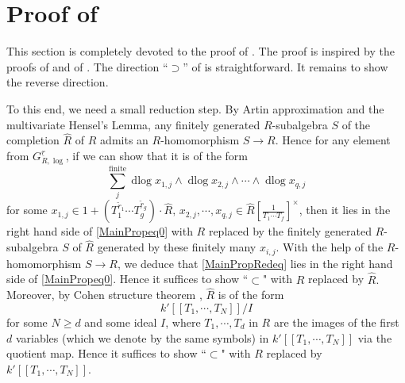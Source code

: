 \documentclass[11pt]{amsart}
\newcommand{\eq}[2]{\begin{equation}\label{#1}#2 \end{equation}}
\newcommand{\ra}{\rightarrow}
\newcommand{\dlog}{\operatorname{dlog}}
\renewcommand{\hat}{\widehat}
\newcommand{\ul}{\underline}
\renewcommand{\tilde}{\widetilde}
\theoremstyle{plain}
\theoremstyle{definition}
\numberwithin{equation}{prop}
\begin{document}
\section{{Proof of }}
This section is completely devoted to the proof of .
The proof is inspired by the proofs of \cite[Proposition 1.2.3]{JSZ} and of \cite[Proposition 1]{Kato82}.
The direction ``$\supset$'' of  is straightforward.
It remains to show the reverse direction.

To this end, we need a small reduction step.
By Artin approximation \cite[Theorem 1.10]{Artin} and the multivariate Hensel's Lemma, any finitely generated $R$-subalgebra $S$ of the completion $\hat R$ of $R$  admits an $R$-homomorphism $S\ra R$. 
Hence for any element from $G^{\ul r}_{R, \log}$, if we can show that it is of the form
\eq{MainPropRedeq}{\sum_j^{\text{finite}}\dlog x_{1,j}\wedge \dlog x_{2,j}\wedge\cdots \wedge\dlog x_{q,j}}
for some
$x_{1,j}\in 
1+(T_1^{\tilde r_1}\cdots  T_g^{\tilde r_g})\cdot \hat R,\,
x_{2,j},\cdots,x_{q,j} \in \hat R[\frac{1}{T_1\cdots T_f}]^\times$,
then it lies in the right hand side of \eqref{MainPropeq0} with $R$ replaced by the finitely generated $R$-subalgebra $S$ of $\hat R$ generated by these finitely many $x_{i,j}$.
With the help of the $R$-homomorphism $S\ra R$, 
we deduce that \eqref{MainPropRedeq} lies in the right hand side of \eqref{MainPropeq0}.
Hence it suffices to show ``$\subset$" with $R$ replaced by $\hat R.$
Moreover, by Cohen structure theorem \cite[\href{https://stacks.math.columbia.edu/tag/032A}{Tag 032A}]{stacks-project}, $\hat R$ is of the form
$$k'[[T_1,\cdots, T_N]]/I$$ 
for some $N\ge d$ and some ideal $I$, 
where $T_1,\cdots,T_d$ in $R$ are the images of the first $d$ variables (which we denote by the same symbols) in $k'[[T_1,\cdots, T_N]]$ via the quotient map.
Hence it suffices to show ``$\subset$" with $R$ replaced by 
$k'[[T_1,\cdots, T_N]]$.
\end{document}
